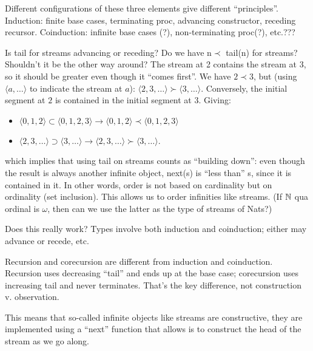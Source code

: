\documentclass{article}
\begin{document}
Different configurations of these three elements give different
``principles''.  Induction: finite base cases, terminating proc,
advancing constructor, receding recursor.  Coinduction: infinite base
cases (?), non-terminating proc(?), etc.???

\begin{remark}
  Is tail for streams advancing or receding?  Do we have n\(\prec\)
  tail(n) for streams?  Shouldn't it be the other way around?  The
  stream at 2 contains the stream at 3, so it should be greater even
  though it ``comes first''.  We have \(2\prec 3\), but (using
  \(\langle a,\ldots\rangle\) to indicate the stream at \(a\)):
  \(\langle 2,3,\ldots\rangle\succ\langle 3,\ldots\rangle\).
  Conversely, the initial segment at \(2\) is contained in the initial
  segment at \(3\).  Giving:
\end{remark}

\begin{itemize}
\item \(\langle 0,1,2\rangle \subset \langle 0,1,2,3\rangle \to\langle 0,1,2\rangle\prec\langle 0,1,2,3\rangle\)
\item \(\langle 2,3,\ldots\rangle\supset\langle 3,\ldots\rangle\to\langle 2,3,\ldots\rangle\succ\langle 3,\ldots\rangle\).
\end{itemize}

which implies that using tail on streams counts as ``building down'':
even though the result is always another infinite object, next(s) is
``less than'' s, since it is contained in it.  In other words, order
is not based on cardinality but on ordinality (set inclusion).  This
allows us to order infinities like streams.  (If \(\mathbb{N}\) qua ordinal
is \(\omega\), then can we use the latter as the type of streams of
Nats?)

\begin{remark}
  Does this really work?  Types involve both induction and
  coinduction; either may advance or recede, etc.
\end{remark}

Recursion and corecursion are different from induction and
coinduction.  Recursion uses decreasing ``tail'' and ends up at the
base case; corecursion uses increasing tail and never terminates.
That's the key difference, not construction v. observation.

This means that so-called infinite objects like streams are
constructive, they are implemented using a ``next'' function that
allows is to construct the head of the stream as we go along.
\end{document}
